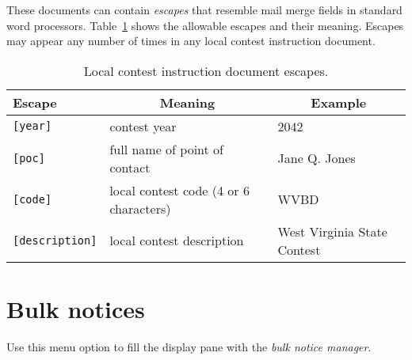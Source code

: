 \documentclass[11pt,letterpaper]{refart}
\newenvironment{fulltable}[1][tbp]
 {\begin{table}[#1]%
  \hspace*{-\leftmarginwidth}%
  \begin{minipage}{\fullwidth}}
 {\end{minipage}\end{table}}
\begin{document}
These documents can contain \emph{escapes} that resemble mail merge
fields in standard word processors. Table~\ref{tbl:lcescapes} shows
the allowable escapes and their meaning. Escapes may appear any number
of times in any local contest instruction document.\
\begin{fulltable}
\centering
\caption{Local contest instruction document escapes.}
\begin{tabular}{lll}
{\bfseries Escape} & 
  \multicolumn{1}{c}{\bfseries Meaning} & 
  \multicolumn{1}{c}{\bfseries Example} \\ \hline
\texttt{[year]} & contest year & 2042 \\
\texttt{[poc]}  & full name of point of contact & Jane Q. Jones \\
\texttt{[code]}  & local contest code (4 or 6 characters) & WVBD \\
\texttt{[description]}  & local contest description & West Virginia State Contest
\end{tabular}
\label{tbl:lcescapes}
\end{fulltable}

\section{Bulk notices}
Use this menu option to fill the display pane with the \emph{bulk notice manager}.
\end{document}
